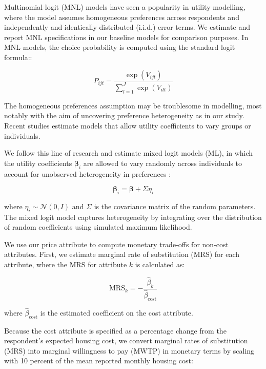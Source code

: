 \documentclass[3p,11pt ]{elsarticle}
\begin{document}
Multinomial logit (MNL) models have seen a popularity in utility modelling,
where the model assumes homogeneous preferences across respondents and independently and identically distributed (i.i.d.) error terms.
We estimate and report MNL specifications in our baseline models for comparison purposes.
In MNL models,
the choice probability is computed using the standard logit formula::

\begin{equation}
P_{ijt} = \frac{\exp(V_{ijt})}{\sum_{l=1}^{J} \exp(V_{ilt})}
\end{equation}

The homogeneous preferences assumption may be troublesome in modelling,
most notably with the aim of uncovering preference heterogeneity as in our study.
Recent studies estimate models that allow utility coefficients to vary groups or individuals\citep{aitkenOlderHomebuyersPrefer2024,zhaoUsingConjointAnalysis2023, caplanMeasuringHeterogeneousPreferences2021}.


We follow this line of research and estimate mixed logit models (ML), in which the utility coefficients \( \boldsymbol{\beta}_i \) are allowed to vary randomly across individuals to account for unobserved heterogeneity in preferences\citep{mcfaddenMixedMNLModels2000}
:

\begin{equation}
\boldsymbol{\beta}_i = \boldsymbol{\beta} + \Sigma \eta_i
\end{equation}

\noindent where \( \eta_i \sim \mathcal{N}(0, I) \) and \( \Sigma \) is the covariance matrix of the random parameters. The mixed logit model captures heterogeneity by integrating over the distribution of random coefficients using simulated maximum likelihood.

We use our price attribute to compute monetary trade-offs for non-cost attributes. 
First,
we estimate marginal rate of substitution (MRS) for each attribute,
where the MRS for attribute \( k \) is calculated as:

\begin{equation}
\text{MRS}_k = -\frac{\hat{\beta}_k}{\hat{\beta}_{\text{cost}}}
\label{eq:mrs}
\end{equation}

\noindent where \( \hat{\beta}_{\text{cost}} \) is the estimated coefficient on the cost attribute.

Because the cost attribute is specified as a percentage change from the respondent’s expected housing cost, we convert marginal rates of substitution (MRS) into marginal willingness to pay (MWTP) in monetary terms by scaling with 10 percent of the mean reported monthly housing cost:
\end{document}
